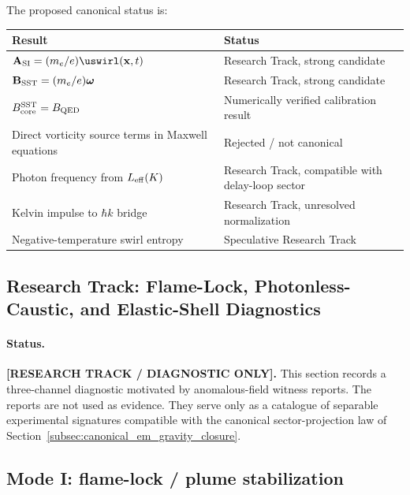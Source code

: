 The proposed canonical status is:

\begin{center}
    \begin{tabular}{ll}
        \hline
        Result & Status \\
        \hline
        \(\mathbf{A}_{\rm SI}=(m_e/e)\uswirl(\mathbf{x},t)\) & Research Track, strong candidate \\
        \(\mathbf{B}_{\rm SST}=(m_e/e)\boldsymbol{\omega}\) & Research Track, strong candidate \\
        \(B_{\rm core}^{\rm SST}=B_{\rm QED}\) & Numerically verified calibration result \\
        Direct vorticity source terms in Maxwell equations & Rejected / not canonical \\
        Photon frequency from \(L_{\rm eff}(K)\) & Research Track, compatible with delay-loop sector \\
        Kelvin impulse to \(\hbar k\) bridge & Research Track, unresolved normalization \\
        Negative-temperature swirl entropy & Speculative Research Track \\
        \hline
    \end{tabular}
\end{center}

\subsection{Research Track: Flame-Lock, Photonless-Caustic, and Elastic-Shell Diagnostics}
\label{sec:rt_flame_photonless_shell}

\paragraph{Status.}
\textbf{[RESEARCH TRACK / DIAGNOSTIC ONLY].}
This section records a three-channel diagnostic motivated by anomalous-field
witness reports. The reports are not used as evidence. They serve only as a
catalogue of separable experimental signatures compatible with the canonical
sector-projection law of Section~\ref{subsec:canonical_em_gravity_closure}.

\subsection{Mode I: flame-lock / plume stabilization}

